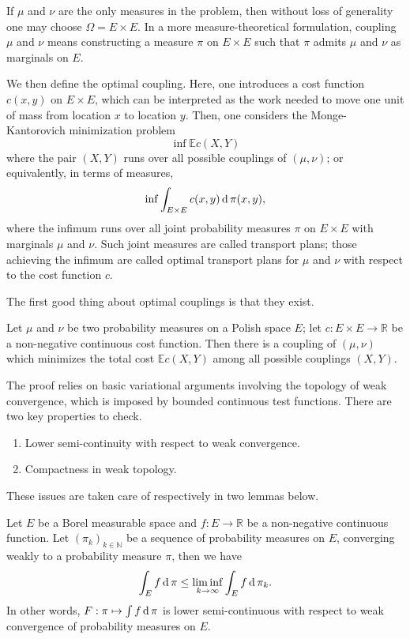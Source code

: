 If \( \mu \) and \( \nu \) are the only measures in the problem,
then without loss of generality one may choose \( \Omega = E \times E .
\) In a more measure-theoretical formulation,
coupling \( \mu \) and \( \nu \) means constructing a measure \( \pi \) on \( E \times E \) such that \( \pi \) admits \( \mu \) and \( \nu \) as marginals on \( E \).

We then define the optimal coupling.
Here, one introduces a cost function \( c ( x , y ) \) on \( E \times E \),
which can be interpreted as the work needed to move one unit of mass from location \( x \) to location \( y \).
Then, one considers the Monge-Kantorovich minimization problem
\[
	\inf  \mathbb{ E } c ( X , Y )
\]
where the pair \( ( X , Y ) \) runs over all possible couplings of \( ( \mu , \nu ) \);
or equivalently, in terms of measures,
\[ \inf \int _ { E \times E } c ( x , y ) \operatorname{d} \pi ( x , y ), \]
where the infimum runs over all joint probability measures \( \pi \) on \( E \times E \) with marginals \( \mu \) and \( \nu \).
Such joint measures are called transport plans;
those achieving the infimum are called optimal transport plans for $\mu$ and $\nu$
with respect to the cost function $c$.

The first good thing about optimal couplings is that they exist.
\begin{thm}
	\label{thm:existence_optimal_coupling}
	Let \(  \mu \) and \(  \nu  \) be two probability measures on a Polish space $E$;
	let \( c: E \times E \rightarrow \mathbb{ R }  \) be
	a non-negative continuous cost function.
	Then there is a coupling of \( ( \mu , \nu ) \) which minimizes the total cost \( \mathbb{ E } c ( X , Y ) \) among all possible couplings \( ( X , Y ) \).
\end{thm}

The proof relies on basic variational arguments involving the topology of weak convergence,
which is imposed by bounded continuous test functions.
There are two key properties to check.
\begin{enumerate}
	\item Lower semi-continuity with respect to weak convergence.
	\item Compactness in weak topology.
\end{enumerate}
These issues are taken care of respectively in two lemmas below.

\begin{lem}
	\label{lem:lower_semi-continuity_of_the_cost_functional}
	Let \( E \) be a Borel measurable space
	and \( f : E  \rightarrow \mathbb{ R }\) be a non-negative continuous function.
	Let \( \left( \pi _ { k } \right) _ { k \in \mathbb{ N } } \) be a sequence of
	probability measures on \( E \),
	converging weakly to a probability measure \( \pi \),
	then we have
	\[
		\int _ { E } f \operatorname{d} \pi \leq \liminf _ { k \rightarrow \infty } \int _ { E } f \operatorname{d} \pi _ { k }.
	\]
	In other words, \( F: \pi \mapsto \int f \operatorname{d} \pi \) is lower semi-continuous
	with respect to weak convergence of probability measures on $E$.
\end{lem}

